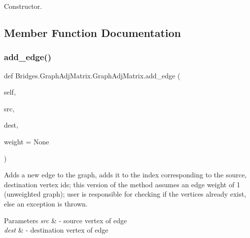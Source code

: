 Constructor. 



\subsection{Member Function Documentation}
\mbox{\label{class_bridges_1_1_graph_adj_matrix_1_1_graph_adj_matrix_aa3d632cff48b735232dc91e22534125f}} 
\subsubsection{\texorpdfstring{add\+\_\+edge()}{add\_edge()}}
{\footnotesize\ttfamily def Bridges.\+Graph\+Adj\+Matrix.\+Graph\+Adj\+Matrix.\+add\+\_\+edge (\begin{DoxyParamCaption}\item[{}]{self,  }\item[{}]{src,  }\item[{}]{dest,  }\item[{}]{weight = {\ttfamily None} }\end{DoxyParamCaption})}



Adds a new edge to the graph, adds it to the index corresponding to the source, destination vertex ids; this version of the method assumes an edge weight of 1 (unweighted graph); user is responsible for checking if the vertices already exist, else an exception is thrown. 


\begin{DoxyParams}{Parameters}
{\em src} & -\/ source vertex of edge \\
\hline
{\em dest} & -\/ destination vertex of edge \\
\hline
\end{DoxyParams}
\mbox{\label{class_bridges_1_1_graph_adj_matrix_1_1_graph_adj_matrix_a2fe88ea2d4d6e60bebd80b17293b3fed}} 
